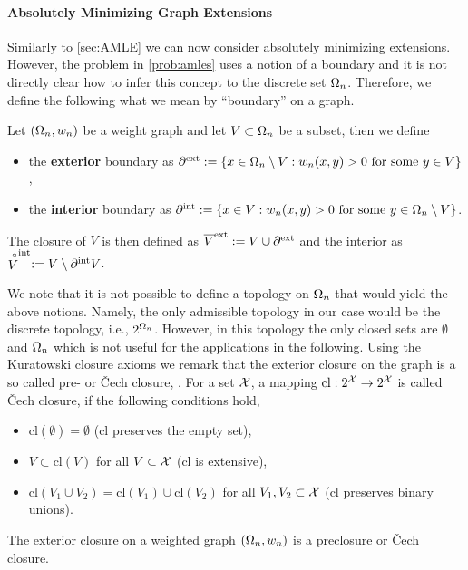 \paragraph{Absolutely Minimizing Graph Extensions}
%
Similarly to \cref{sec:AMLE} we can now consider absolutely minimizing extensions. However, the problem in 
\cref{prob:amles} uses a notion of a boundary and it is not directly clear how to infer this concept to the discrete set $\Omega_n$. Therefore, we define the following what we mean by \enquote{boundary} on a graph.
%
\begin{definition}{}{}
Let $(\Omega_n, w_n)$ be a weight graph and let $V\subset\Omega_n$ be a subset, then we define
%
\begin{itemize}
\item the \textbf{exterior} boundary as $\partial^{\text{ext}} :=\{x\in \Omega_n\setminus V: w_n(x,y) > 0 \text{ for some } y\in V\}$,
\item the \textbf{interior} boundary as $\partial^{\text{int}} :=\{x\in V: w_n(x,y) > 0 \text{ for some } y\in \Omega_n\setminus V\}$.
\end{itemize}
%
The closure of $V$ is then defined as $\overline{V}^{\text{ext}} := V\cup \partial^{\text{ext}}$ and the interior as 
$\stackrel{\circ}{V}^{\text{int}}:= V\setminus \partial^{\text{int}} V$.
\end{definition}
%
%
\noindent%
We note that it is not possible to define a topology on $\Omega_n$ that would yield the above notions. Namely, the only admissible topology in our case would be the discrete topology, i.e., $2^{\Omega_n}$. However, in this topology the only closed sets are $\emptyset$ and $\Omega_n$ which is not useful for the applications in the following. Using the Kuratowski closure axioms \cite{kuratowski1922operation} we remark that the exterior closure on the graph is a so called pre- or Čech closure, \cite{vcech1966topological}. For a set $\mathcal{X}$, a mapping $\text{cl}:2^{\mathcal{X}}\to 2^{\mathcal{X}}$ is called Čech closure, if the following conditions hold,
%
\begin{itemize}
\item $\text{cl}(\emptyset) = \emptyset$ ($\text{cl}$ preserves the empty set),
\item $V\subset \text{cl}(V)$ for all $V\subset \mathcal{X}$ ($\text{cl}$ is extensive),
\item $\text{cl}(V_1 \cup V_2) = \text{cl}(V_1)\cup \text{cl}(V_2)$ for all $V_1,V_2\subset \mathcal{X}$ ($\text{cl}$ preserves binary unions).
\end{itemize}
%
\begin{lemma}{}{}
The exterior closure on a weighted graph $(\Omega_n, w_n)$ is a preclosure or Čech closure.
\end{lemma}
